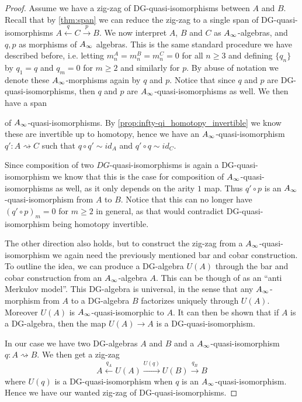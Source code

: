\begin{proof}
Assume we have a zig-zag of DG-quasi-isomorphisms between $A$ and $B$. Recall that by \cref{thm:span} we can reduce the zig-zag to a single span of DG-quasi-isomorphisms $A\overset{q}\longleftarrow C\overset{p}\longrightarrow B$. We now interpret $A$, $B$ and $C$ as $A_{\infty}$-algebras, and $q, p$ as morphisms of $A_{\infty}$ algebras. This is the same standard procedure we have described before, i.e. letting $m^A_n = m^B_n = m^C_n = 0$ for all $n\geq 3$ and defining $\{q_n\}$ by $q_1 = q$ and $q_m = 0$ for $m\geq 2$ and similarly for $p$. By abuse of notation we denote these $A_{\infty}$-morphisms again by $q$ and $p$. Notice that since $q$ and $p$ are DG-quasi-isomorphisms, then $q$ and $p$ are $A_{\infty}$-quasi-isomorphisms as well. We then have a span 
\begin{center}
\end{center}
of $A_{\infty}$-quasi-isomorphisms. By \cref{prop:infty-qi_homotopy_invertible} we know these are invertible up to homotopy, hence we have an $A_{\infty}$-quasi-isomorphism $q'\colon A\rightsquigarrow C$ such that $q\circ q' \sim id_A$ and $q'\circ q \sim id_C$. 

Since composition of two $DG$-quasi-isomorphisms is again a DG-quasi-isomorphism we know that this is the case for composition of $A_{\infty}$-quasi-isomorphisms as well, as it only depends on the arity $1$ map. Thus $q'\circ p$ is an $A_{\infty}$-quasi-isomorphism from $A$ to $B$. Notice that this can no longer have $(q'\circ p)_m = 0$ for $m\geq 2$ in general, as that would contradict DG-quasi-isomorphism being homotopy invertible. 

The other direction also holds, but to construct the zig-zag from a $A_{\infty}$-quasi-isomorphism we again need the previously mentioned bar and cobar construction. To outline the idea, we can produce a DG-algebra $U(A)$ through the bar and cobar construction from an $A_{\infty}$-algebra $A$. This can be though of as an ``anti Merkulov model''. This DG-algebra is universal, in the sense that any $A_{\infty}$-morphism from $A$ to a DG-algebra $B$ factorizes uniquely through $U(A)$. Moreover $U(A)$ is $A_{\infty}$-quasi-isomorphic to $A$. It can then be shown that if $A$ is a DG-algebra, then the map $U(A)\longrightarrow A$ is a DG-quasi-isomorphism. 

In our case we have two DG-algebras $A$ and $B$ and a $A_{\infty}$-quasi-isomorphism $q\colon A\rightsquigarrow B$. We then get a zig-zag
\begin{equation*}
    A\overset{q_A}\longleftarrow U(A) \overset{U(q)}\longrightarrow U(B)\overset{q_B}\longrightarrow B
\end{equation*}
where $U(q)$ is a DG-quasi-isomorphism when $q$ is an $A_{\infty}$-quasi-isomorphism. Hence we have our wanted zig-zag of DG-quasi-isomorphisms. 
\end{proof}

